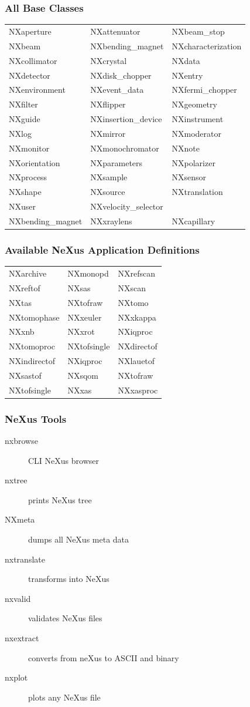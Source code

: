 \documentclass{beamer}
\newcommand{\changefont}[3] {
 \fontfamily{#1} \fontseries{#2} \fontshape{#3} \selectfont}
\begin{document}
\begin{frame}
\frametitle{All Base Classes}
\begin{tabular}{lll}
NXaperture & NXattenuator & NXbeam\_stop \\
NXbeam     & NXbending\_magnet & NXcharacterization \\
NXcollimator & NXcrystal & NXdata \\
NXdetector   & NXdisk\_chopper & NXentry \\
NXenvironment & NXevent\_data & NXfermi\_chopper \\
NXfilter & NXflipper & NXgeometry \\
NXguide & NXinsertion\_device & NXinstrument \\
NXlog & NXmirror & NXmoderator \\
NXmonitor & NXmonochromator & NXnote \\
NXorientation & NXparameters & NXpolarizer\\
NXprocess & NXsample & NXsensor \\
NXshape & NXsource & NXtranslation\\
NXuser & NXvelocity\_selector & \\
NXbending\_magnet & NXxraylens &NXcapillary\\
\end{tabular}
\end{frame}


\begin{frame} \frametitle{Available NeXus Application Definitions}
{\changefont{cmr}{bx}{sc} 
\begin{tabular}{lll}
NXarchive& NXmonopd & NXrefscan \\
NXreftof & NXsas & NXscan \\
NXtas & NXtofraw& NXtomo\\
NXtomophase & NXxeuler & NXxkappa\\
NXxnb & NXxrot & NXiqproc \\
NXtomoproc & NXtofsingle& NXdirectof\\
NXindirectof & NXiqproc& NXlauetof\\
NXsastof& NXsqom& NXtofraw\\
NXtofsingle& NXxas& NXxasproc\\
\end{tabular}
}
\end{frame}

\begin{frame} \frametitle{NeXus Tools}
\begin{description}
\item[nxbrowse] CLI NeXus browser
\item[nxtree] prints NeXus tree
\item[NXmeta] dumps all NeXus meta data
\item[nxtranslate] transforms into NeXus 
\item[nxvalid] validates NeXus files 
\item[nxextract] converts from neXus to ASCII and binary
\item[nxplot] plots any NeXus file
\end{description}
\end{frame}
\end{document}
